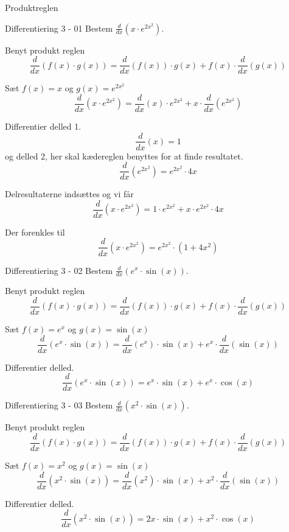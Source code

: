 \documentclass{article}
\begin{document}
Produktreglen
\tableofcontents
\newpage

\begin{exercise}{Differentiering 3 - 01}
Bestem $\frac{d}{dx} \left( x \cdot e^{2x^2} \right)$.


\hint
Benyt produkt reglen
\[
\frac{d}{dx} \left( f(x) \cdot g(x) \right) = \frac{d}{dx} \left( f(x) \right) \cdot g(x) + f(x) \cdot \frac{d}{dx} \left( g(x) \right)
\]

\hint
Sæt $f(x) = x$ og $g(x) = e^{2x^2}$
\[
\frac{d}{dx} \left( x \cdot e^{2x^2} \right) = \frac{d}{dx} \left( x \right) \cdot e^{2x^2} + x \cdot \frac{d}{dx} \left( e^{2x^2} \right)
\]

\hint
Differentier delled 1.
\[
\frac{d}{dx} \left( x \right) = 1
\]
og delled 2, her skal kædereglen benyttes for at finde resultatet.
\[
\frac{d}{dx} \left( e^{2x^2} \right) = e^{2x^2} \cdot 4x
\]


\hint
Delresultaterne indsættes og vi får
\[
\frac{d}{dx} \left( x \cdot e^{2x^2} \right) = 1 \cdot e^{2x^2} + x \cdot e^{2x^2} \cdot 4x
\]

\hint
Der forenkles til 
\[
\frac{d}{dx} \left( x \cdot e^{2x^2} \right) = e^{2x^2} \cdot (1 + 4x^2) 
\]

\end{exercise}


\begin{exercise}{Differentiering 3 - 02}
Bestem $\frac{d}{dx} \left( e^x \cdot \sin(x) \right)$.


\hint
Benyt produkt reglen
\[
\frac{d}{dx} \left( f(x) \cdot g(x) \right) = \frac{d}{dx} \left( f(x) \right) \cdot g(x) + f(x) \cdot \frac{d}{dx} \left( g(x) \right)
\]

\hint
Sæt $f(x) = e^x$ og $g(x) = \sin(x)$
\[
\frac{d}{dx} \left( e^x \cdot \sin(x) \right) = \frac{d}{dx} \left( e^x \right) \cdot \sin(x) + e^x \cdot \frac{d}{dx} \left( \sin(x) \right)
\]

\hint
Differentier delled.
\[
\frac{d}{dx} \left( e^x \cdot \sin(x) \right) = e^x \cdot \sin(x) + e^x \cdot \cos(x)
\]
\end{exercise}


\begin{exercise}{Differentiering 3 - 03}
	Bestem $\frac{d}{dx} \left( x^2 \cdot \sin(x) \right)$.
	
	
	\hint
	Benyt produkt reglen
	\[
	\frac{d}{dx} \left( f(x) \cdot g(x) \right) = \frac{d}{dx} \left( f(x) \right) \cdot g(x) + f(x) \cdot \frac{d}{dx} \left( g(x) \right)
	\]
	
	\hint
	Sæt $f(x) = x^2$ og $g(x) = \sin(x)$
	\[
	\frac{d}{dx} \left( x^2 \cdot \sin(x) \right) = \frac{d}{dx} \left( x^2 \right) \cdot \sin(x) + x^2 \cdot \frac{d}{dx} \left( \sin(x) \right)
	\]
	
	\hint
	Differentier delled.
	\[
	\frac{d}{dx} \left( x^2 \cdot \sin(x) \right) = 2x \cdot \sin(x) + x^2 \cdot \cos(x)
	\]
\end{exercise}
\end{document}
